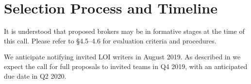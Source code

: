 \documentclass[DM,toc,lsstdraft]{lsstdoc}
\begin{document}
\section{Selection Process and Timeline}

It is understood that proposed brokers may be in formative stages at the time of this call.
Please refer to  \S4.5--4.6 for evaluation criteria and procedures.

We anticipate notifying invited LOI writers in August 2019.
As described in  we expect the call for full proposals to invited teams in Q4 2019, with an anticipated due date in Q2 2020.

%


\end{document}
